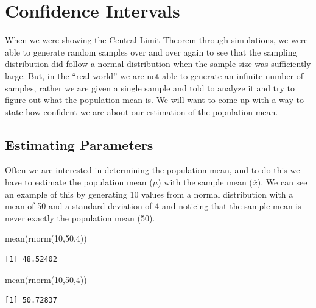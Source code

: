 \documentclass[
  letterpaper,
  DIV=11,
  numbers=noendperiod]{scrreprt}
\newenvironment{Shaded}{\begin{snugshade}}{\end{snugshade}}
\newcommand{\DecValTok}[1]{\textcolor[rgb]{0.68,0.00,0.00}{#1}}
\newcommand{\FunctionTok}[1]{\textcolor[rgb]{0.28,0.35,0.67}{#1}}
\newcommand{\NormalTok}[1]{\textcolor[rgb]{0.00,0.23,0.31}{#1}}
\begin{document}

\chapter{Confidence Intervals}\label{confidence-intervals}

When we were showing the Central Limit Theorem through simulations, we
were able to generate random samples over and over again to see that the
sampling distribution did follow a normal distribution when the sample
size was sufficiently large. But, in the ``real world'' we are not able
to generate an infinite number of samples, rather we are given a single
sample and told to analyze it and try to figure out what the population
mean is. We will want to come up with a way to state how confident we
are about our estimation of the population mean.

\section{Estimating Parameters}\label{estimating-parameters}

Often we are interested in determining the population mean, and to do
this we have to estimate the population mean (\(\mu\)) with the sample
mean (\(\overline{x}\)). We can see an example of this by generating 10
values from a normal distribution with a mean of 50 and a standard
deviation of 4 and noticing that the sample mean is never exactly the
population mean (50).

\begin{Shaded}
\begin{Highlighting}[]
\FunctionTok{mean}\NormalTok{(}\FunctionTok{rnorm}\NormalTok{(}\DecValTok{10}\NormalTok{,}\DecValTok{50}\NormalTok{,}\DecValTok{4}\NormalTok{))}
\end{Highlighting}
\end{Shaded}

\begin{verbatim}
[1] 48.52402
\end{verbatim}

\begin{Shaded}
\begin{Highlighting}[]
\FunctionTok{mean}\NormalTok{(}\FunctionTok{rnorm}\NormalTok{(}\DecValTok{10}\NormalTok{,}\DecValTok{50}\NormalTok{,}\DecValTok{4}\NormalTok{))}
\end{Highlighting}
\end{Shaded}

\begin{verbatim}
[1] 50.72837
\end{verbatim}
\end{document}
